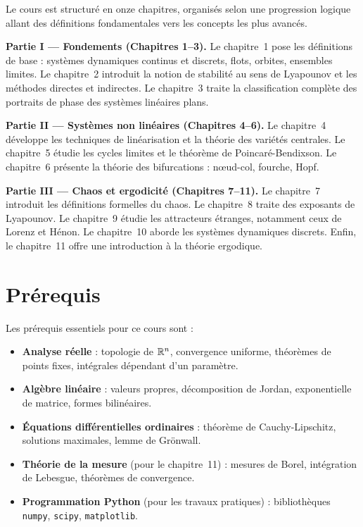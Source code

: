 Le cours est structur\'e en onze chapitres, organis\'es selon une progression
logique allant des d\'efinitions fondamentales vers les concepts les plus
avanc\'es.

\medskip

\noindent\textbf{Partie I --- Fondements (Chapitres 1--3).}
Le chapitre~1 pose les d\'efinitions de base : syst\`emes dynamiques continus
et discrets, flots, orbites, ensembles limites. Le chapitre~2 introduit la
notion de stabilit\'e au sens de Lyapounov et les m\'ethodes directes et
indirectes. Le chapitre~3 traite la classification compl\`ete des portraits
de phase des syst\`emes lin\'eaires plans.

\medskip

\noindent\textbf{Partie II --- Syst\`emes non lin\'eaires (Chapitres 4--6).}
Le chapitre~4 d\'eveloppe les techniques de lin\'earisation et la th\'eorie
des vari\'et\'es centrales. Le chapitre~5 \'etudie les cycles limites et le
th\'eor\`eme de Poincar\'e-Bendixson. Le chapitre~6 pr\'esente la th\'eorie
des bifurcations : n\oe ud-col, fourche, Hopf.

\medskip

\noindent\textbf{Partie III --- Chaos et ergodicit\'e (Chapitres 7--11).}
Le chapitre~7 introduit les d\'efinitions formelles du chaos. Le chapitre~8
traite des exposants de Lyapounov. Le chapitre~9 \'etudie les attracteurs
\'etranges, notamment ceux de Lorenz et H\'enon. Le chapitre~10 aborde les
syst\`emes dynamiques discrets. Enfin, le chapitre~11 offre une introduction
\`a la th\'eorie ergodique.

\section*{Pr\'erequis}

Les pr\'erequis essentiels pour ce cours sont :

\begin{itemize}
    \item \textbf{Analyse r\'eelle} : topologie de $\mathbb{R}^n$, convergence
    uniforme, th\'eor\`emes de points fixes, int\'egrales d\'ependant d'un
    param\`etre.

    \item \textbf{Alg\`ebre lin\'eaire} : valeurs propres, d\'ecomposition
    de Jordan, exponentielle de matrice, formes bilin\'eaires.

    \item \textbf{\'Equations diff\'erentielles ordinaires} : th\'eor\`eme de
    Cauchy-Lipschitz, solutions maximales, lemme de Gr\"onwall.

    \item \textbf{Th\'eorie de la mesure} (pour le chapitre~11) : mesures
    de Borel, int\'egration de Lebesgue, th\'eor\`emes de convergence.

    \item \textbf{Programmation Python} (pour les travaux pratiques) :
    biblioth\`eques \texttt{numpy}, \texttt{scipy}, \texttt{matplotlib}.
\end{itemize}

